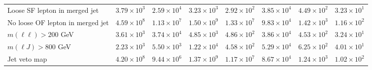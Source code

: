 \begin{table}[htp]
{\begin{tabular}{l | c c c c | c c c}
      Loose SF lepton in merged jet & $3.79 \times 10^{3}$ & $2.59 \times 10^{4}$ & $3.23 \times 10^{3}$ & $2.92 \times 10^{2}$ & $3.85 \times 10^{4}$ & $4.49 \times 10^{2}$ & $3.23 \times 10^{1}$ \\
      No loose OF lepton in merged jet & $4.59 \times 10^{8}$ & $1.13 \times 10^{7}$ & $1.50 \times 10^{9}$ & $1.33 \times 10^{7}$ & $9.83 \times 10^{4}$ & $1.42 \times 10^{3}$ & $1.16 \times 10^{2}$ \\
      $m(\ell\ell) > 200$ GeV & $3.61 \times 10^{3}$ & $3.74 \times 10^{4}$ & $4.85 \times 10^{3}$ & $4.86 \times 10^{2}$ & $3.86 \times 10^{4}$ & $4.53 \times 10^{2}$ & $3.24 \times 10^{1}$ \\
      $m(\ell J) > 800$ GeV & $2.23 \times 10^{3}$ & $5.50 \times 10^{3}$ & $1.22 \times 10^{4}$ & $4.58 \times 10^{2}$ & $5.29 \times 10^{4}$ & $6.25 \times 10^{2}$ & $4.01 \times 10^{1}$ \\
      Jet veto map & $4.20 \times 10^{8}$ & $9.44 \times 10^{6}$ & $1.37 \times 10^{9}$ & $1.17 \times 10^{7}$ & $8.67 \times 10^{4}$ & $1.24 \times 10^{3}$ & $1.02 \times 10^{2}$ \\
      \hline
    \end{tabular}
  }
\end{table}
